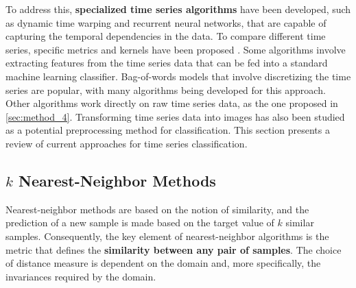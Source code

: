 To address this, \textbf{specialized time series algorithms} have been developed, such as dynamic time warping and recurrent neural networks, that are capable of capturing the temporal dependencies in the data. 
To compare different time series, specific metrics and kernels have been proposed \cite{abanda2019review}. Some algorithms involve extracting features from the time series data that can be fed into a standard machine learning classifier. Bag-of-words models that involve discretizing the time series are popular, with many algorithms being developed for this approach. Other algorithms work directly on raw time series data, as the one proposed in \cref{sec:method_4}. Transforming time series data into images has also been studied as a potential preprocessing method for classification. 
This section presents a review of current approaches for time series classification.




\subsection{$k$ Nearest-Neighbor Methods}

Nearest-neighbor methods are based on the notion of similarity, and the prediction of a new sample is made based on the target value of $k$ similar samples.
Consequently, the key element of nearest-neighbor algorithms is the metric that defines the \textbf{similarity between any pair of samples}.
The choice of distance measure is dependent on the domain and, more specifically, the invariances required by the domain. 


